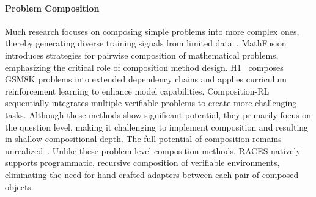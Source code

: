 \paragraph{Problem Composition}
Much research focuses on composing simple problems into more complex ones, thereby generating diverse training signals from limited data~\citep{pan2025reststresstestinglarge,zhou2025gsminfty,chen-etal-2024-sifo}.
MathFusion~\citep{pei-etal-2025-mathfusion} introduces strategies for pairwise composition of mathematical problems, emphasizing the critical role of composition method design.
H1~\citep{motwani2025h1bootstrappingllmsreason} composes GSM8K problems into extended dependency chains and applies curriculum reinforcement learning to enhance model capabilities.
Composition-RL~\citep{xu2026compositionrlcomposeverifiableprompts} sequentially integrates multiple verifiable problems to create more challenging tasks.
Although these methods show significant potential, they primarily focus on the question level, making it challenging to implement composition and resulting in shallow compositional depth. The full potential of composition remains unrealized~\citep{pei-etal-2025-mathfusion}.
Unlike these problem-level composition methods, RACES natively supports programmatic, recursive composition of verifiable environments, eliminating the need for hand-crafted adapters between each pair of composed objects.